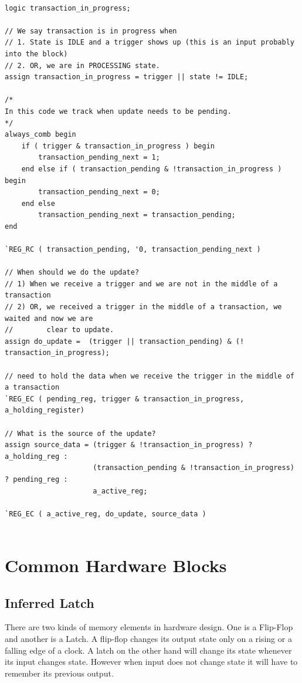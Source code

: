 \documentclass{article}
\begin{document}
\begin{lstlisting}[style=svstyle]

logic transaction_in_progress;

// We say transaction is in progress when 
// 1. State is IDLE and a trigger shows up (this is an input probably into the block)
// 2. OR, we are in PROCESSING state. 
assign transaction_in_progress = trigger || state != IDLE; 

/*
In this code we track when update needs to be pending.
*/
always_comb begin 
	if ( trigger & transaction_in_progress ) begin 
		transaction_pending_next = 1;
	end else if ( transaction_pending & !transaction_in_progress ) begin
		transaction_pending_next = 0;
	end else 
		transaction_pending_next = transaction_pending;
end

`REG_RC ( transaction_pending, '0, transaction_pending_next )

// When should we do the update?
// 1) When we receive a trigger and we are not in the middle of a transaction
// 2) OR, we received a trigger in the middle of a transaction, we waited and now we are
//        clear to update.
assign do_update =  (trigger || transaction_pending) & (! transaction_in_progress);

// need to hold the data when we receive the trigger in the middle of a transaction
`REG_EC ( pending_reg, trigger & transaction_in_progress, a_holding_register)

// What is the source of the update?
assign source_data = (trigger & !transaction_in_progress) ? a_holding_reg : 
                     (transaction_pending & !transaction_in_progress) ? pending_reg :
                     a_active_reg;

`REG_EC ( a_active_reg, do_update, source_data )
					

\end{lstlisting}

\section{Common Hardware Blocks}
\subsection{Inferred Latch}

There are two kinds of memory elements in hardware design. One is a Flip-Flop and another is a Latch. A flip-flop changes its output state only on a rising or a falling edge of a clock. A latch on the other hand will change its state whenever its input changes state. However when input does not change state it will have to remember its previous output. 
\end{document}
